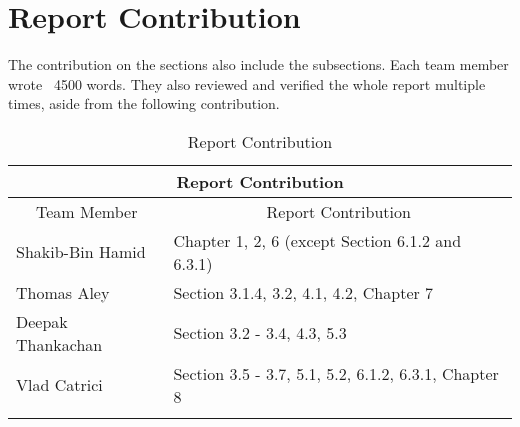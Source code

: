 \chapter{Report Contribution}
\label{appendix:report-contribution}

The contribution on the sections also include the subsections. Each team member wrote ~4500 words. They also reviewed and verified the whole report multiple times, aside from the following contribution.

\begin{longtable}{ |p{3cm}|p{10.4cm}|}

 \hline
 	\multicolumn{2}{|c|}{Report Contribution} \\
  \hline
    \multicolumn{1}{|c|}{Team Member} &
  	\multicolumn{1}{|c|}{Report Contribution} \\
  \hline
 	 Shakib-Bin Hamid & Chapter 1, 2, 6 (except Section 6.1.2 and 6.3.1) \\
   \hline
   Thomas Aley & Section 3.1.4, 3.2, 4.1, 4.2, Chapter 7 \\
   \hline
   Deepak Thankachan & Section 3.2 - 3.4, 4.3, 5.3 \\
  \hline
  Vlad Catrici & Section 3.5 - 3.7, 5.1, 5.2, 6.1.2, 6.3.1, Chapter 8\\
  \hline
  \caption{Report Contribution}
  \label{tab:report-contribution}
\end{longtable}
